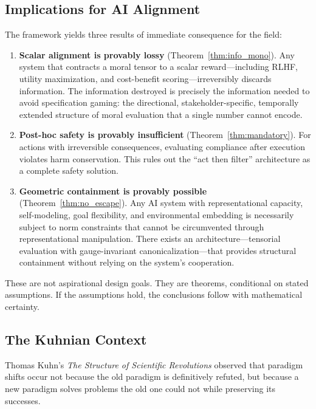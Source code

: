 \documentclass[12pt,letterpaper]{article}
\theoremstyle{definition}
\theoremstyle{remark}
\begin{document}
\subsection{Implications for AI Alignment}

The framework yields three results of immediate consequence for the field:

\begin{enumerate}
    \item \textbf{Scalar alignment is provably lossy} (Theorem~\ref{thm:info_mono}). Any system that contracts a moral tensor to a scalar reward---including RLHF, utility maximization, and cost-benefit scoring---irreversibly discards information. The information destroyed is precisely the information needed to avoid specification gaming: the directional, stakeholder-specific, temporally extended structure of moral evaluation that a single number cannot encode.
    \item \textbf{Post-hoc safety is provably insufficient} (Theorem~\ref{thm:mandatory}). For actions with irreversible consequences, evaluating compliance after execution violates harm conservation. This rules out the ``act then filter'' architecture as a complete safety solution.
    \item \textbf{Geometric containment is provably possible} (Theorem~\ref{thm:no_escape}). Any AI system with representational capacity, self-modeling, goal flexibility, and environmental embedding is necessarily subject to norm constraints that cannot be circumvented through representational manipulation. There exists an architecture---tensorial evaluation with gauge-invariant canonicalization---that provides structural containment without relying on the system's cooperation.
\end{enumerate}

These are not aspirational design goals. They are theorems, conditional on stated assumptions. If the assumptions hold, the conclusions follow with mathematical certainty.

\subsection{The Kuhnian Context}

Thomas Kuhn's \emph{The Structure of Scientific Revolutions} \cite{kuhn1962} observed that paradigm shifts occur not because the old paradigm is definitively refuted, but because a new paradigm solves problems the old one could not while preserving its successes.
\end{document}

